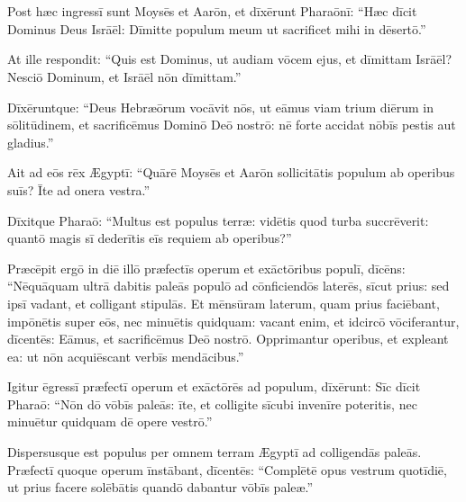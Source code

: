 \chapter{}

Post hæc ingressī sunt Moysēs et Aarōn,
et dīxērunt Pharaōnī: ``Hæc dīcit Dominus Deus Isrāēl:
Dīmitte populum meum ut sacrificet mihi in dēsertō.''

At ille respondit: ``Quis est Dominus,
ut audiam vōcem ejus, et dīmittam Isrāēl?
Nesciō Dominum, et Isrāēl nōn dīmittam.''

Dīxēruntque: ``Deus Hebræōrum vocāvit nōs,
ut eāmus viam trium diērum in sōlitūdinem,
et sacrificēmus Dominō Deō nostrō:
nē forte accidat nōbīs pestis aut gladius.''

Ait ad eōs rēx Ægyptī: ``Quārē Moysēs et Aarōn sollicitātis populum ab operibus suīs? Īte ad onera vestra.''

Dīxitque Pharaō: ``Multus est populus terræ:
vidētis quod turba succrēverit:
quantō magis sī dederītis eīs requiem ab operibus?''

Præcēpit ergō in diē illō præfectīs operum
et exāctōribus populī, dīcēns: 
``Nēquāquam ultrā dabitis paleās populō ad cōnficiendōs laterēs,
sīcut prius: sed ipsī vadant, et colligant stipulās.
Et mēnsūram laterum, quam prius faciēbant,
impōnētis super eōs, nec minuētis quidquam:
vacant enim, et idcircō vōciferantur, dīcentēs:
Eāmus, et sacrificēmus Deō nostrō.
Opprimantur operibus, et expleant ea:
ut nōn acquiēscant verbīs mendācibus.''

Igitur ēgressī præfectī operum et exāctōrēs ad populum,
dīxērunt: Sīc dīcit Pharaō: ``Nōn dō vōbīs paleās: īte,
et colligite sīcubi invenīre poteritis,
nec minuētur quidquam dē opere vestrō.''

Dispersusque est populus per omnem terram Ægyptī ad colligendās paleās.
Præfectī quoque operum
īnstābant, dīcentēs: ``Complētē opus vestrum quotīdiē,
ut prius facere solēbātis quandō dabantur vōbīs paleæ.''

